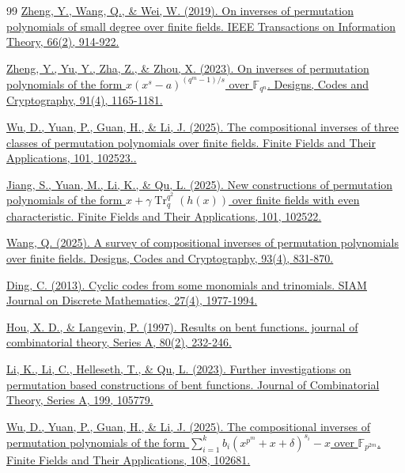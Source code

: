 \documentclass{birkjour}
\theoremstyle{definition}
\theoremstyle{remark}
\numberwithin{equation}{section}
\begin{document}
\begin{thebibliography}{99}
	\href{https://ieeexplore.ieee.org/abstract/document/8823044}{Zheng, Y., Wang, Q., \& Wei, W. (2019). On inverses of permutation polynomials of small degree over finite fields. IEEE Transactions on Information Theory, 66(2), 914-922.}
		
	\href{https://doi.org/10.1007/s10623-022-01142-z}{Zheng, Y., Yu, Y., Zha, Z., \& Zhou, X. (2023). On inverses of permutation polynomials of the form $x(x^s-a)^{(q^m-1)/s}$ over $\mathbb{F}_{q^n}$. Designs, Codes and Cryptography, 91(4), 1165-1181.}
		
	\href{https://doi.org/10.1016/j.ffa.2024.102523}{Wu, D., Yuan, P., Guan, H., \& Li, J. (2025). The compositional inverses of three classes of permutation polynomials over finite fields. Finite Fields and Their Applications, 101, 102523..}
	
	\href{https://doi.org/10.1016/j.ffa.2024.102522}{Jiang, S., Yuan, M., Li, K., \& Qu, L. (2025). New constructions of permutation polynomials of the form $x+ \gamma\operatorname{Tr}_q^{q^2} (h (x))$ over finite fields with even characteristic. Finite Fields and Their Applications, 101, 102522.}
	
	\href{https://doi.org/10.1007/s10623-024-01436-4}{Wang, Q. (2025). A survey of compositional inverses of permutation polynomials over finite fields. Designs, Codes and Cryptography, 93(4), 831-870.}
	
	\href{https://doi.org/10.1137/120882275}{Ding, C. (2013). Cyclic codes from some monomials and trinomials. SIAM Journal on Discrete Mathematics, 27(4), 1977-1994.}
	
	\href{https://doi.org/10.1006/jcta.1997.2804}{Hou, X. D., \& Langevin, P. (1997). Results on bent functions. journal of combinatorial theory, Series A, 80(2), 232-246.}
	
	\href{https://doi.org/10.1016/j.jcta.2023.105779}{Li, K., Li, C., Helleseth, T., \& Qu, L. (2023). Further investigations on permutation based constructions of bent functions. Journal of Combinatorial Theory, Series A, 199, 105779.}
	
	\href{https://doi.org/10.1016/j.ffa.2025.102681}{Wu, D., Yuan, P., Guan, H., \& Li, J. (2025). The compositional inverses of permutation polynomials of the form $\sum_{i=1}^{k}b_i (x^{p^m}+ x+\delta)^{s_i}-x$ over $\mathbb{F}_{p^{2m}}$. Finite Fields and Their Applications, 108, 102681.}
	
\end{thebibliography}
\end{document}
